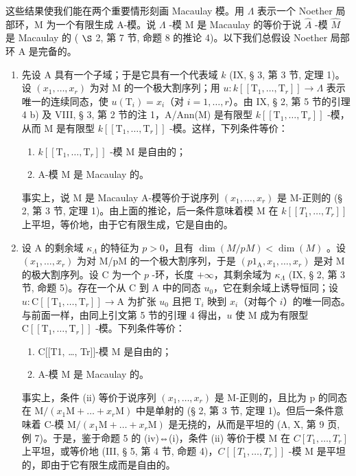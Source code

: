 这些结果使我们能在两个重要情形刻画 Macaulay 模。用 \(\Lambda\) 表示一个 Noether 局部环，M 为一个有限生成 A-模。说 \(\Lambda\) -模 M 是 Macaulay 的等价于说 \(\widehat{A}\) -模 \(\widehat{M}\) 是 Macaulay 的 ( \(\S\) 2, 第 7 节, 命题 8 的推论 4)。以下我们总假设 Noether 局部环 A 是完备的。

\begin{enumerate}
\def\labelenumi{\arabic{enumi})}
\tightlist
\item
  先设 A 具有一个子域；于是它具有一个代表域 \(k\) (IX, § 3, 第 3 节, 定理 1)。设 \((x_{1},\ldots ,x_{r})\) 为对 M 的一个极大割序列；用 \(u:k[[\mathrm{T}_{1},\dots ,\mathrm{T}_{r}]]\longrightarrow \Lambda\) 表示唯一的连续同态，使 \(u(\mathrm{T}_i) = x_i\)（对 \(i = 1,\dots ,r\)）。由 IX, § 2, 第 5 节的引理 4 b) 及 VIII, § 3, 第 2 节的注 1，A/Ann(M) 是有限型 \(k[[\mathrm{T}_{1},\dots ,\mathrm{T}_{r}]]\) -模，从而 M 是有限型 \(k[[\mathrm{T}_{1},\dots ,\mathrm{T}_{r}]]\) -模。这样，下列条件等价：
  \begin{enumerate}
  \def\labelenumii{(\roman{enumii})}
  \item
    \(k[[\mathrm{T}_1,\dots ,\mathrm{T}_r]]\) -模 M 是自由的；
\item
    A-模 M 是 Macaulay 的。
\end{enumerate}

事实上，说 M 是 Macaulay A-模等价于说序列 \((x_{1},\ldots,x_{r})\) 是 M-正则的 (§ 2, 第 3 节, 定理 1)。由上面的推论，后一条件意味着模 M 在 \(k[[T_{1},\ldots,T_{r}]]\) 上平坦，等价地，由于它有限生成，它是自由的。

\item
  设 A 的剩余域 \(\kappa_{\Lambda}\) 的特征为 \(p > 0\)，且有 \(\dim(M/pM) < \dim(M)\) 。设 \((x_1, \ldots, x_r)\) 为对 M/pM 的一个极大割序列，于是 \((p1_{\mathrm{A}}, x_1, \ldots, x_r)\) 是对 M 的极大割序列。设 C 为一个 \(p\) -环，长度 \(+\infty\)，其剩余域为 \(\kappa_{\Lambda}\) (IX, § 2, 第 3 节, 命题 5)。存在一个从 C 到 A 中的同态 \(u_0\)，它在剩余域上诱导恒同；设 \(u: \mathrm{C}[[\mathrm{T}_1, \ldots, \mathrm{T}_r]] \longrightarrow \mathrm{A}\) 为扩张 \(u_0\) 且把 \(\mathrm{T}_i\) 映到 \(x_i\)（对每个 \(i\)）的唯一同态。与前面一样，由同上引文第 5 节的引理 4 得出，\(u\) 使 M 成为有限型 \(\mathrm{C}[[\mathrm{T}_1, \ldots, \mathrm{T}_r]]\) -模。下列条件等价：
  \begin{enumerate}
  \def\labelenumii{(\roman{enumii})}
\item
    C{[}{[}T1, \ldots, Tr{]}{]}-模 M 是自由的；
\item
    A-模 M 是 Macaulay 的。
\end{enumerate}

事实上，条件 (ii) 等价于说序列 \((x_{1},\ldots,x_{r})\) 是 M-正则的，且比为 p 的同态在 \(\mathrm{M}/(x_{1}\mathrm{M}+\ldots+x_{r}\mathrm{M})\) 中是单射的 (§ 2, 第 3 节, 定理 1)。但后一条件意味着 C-模 \(\mathrm{M}/(x_{1}\mathrm{M}+\ldots+x_{r}\mathrm{M})\) 是无挠的，从而是平坦的 (Λ, X, 第 9 页, 例 7)。于是，鉴于命题 5 的 (iv)⇔(i)，条件 (ii) 等价于模 M 在 \(C[T_{1},\ldots,T_{r}]\) 上平坦，或等价地 (III, § 5, 第 4 节, 命题 4)，\(C[[T_{1},\ldots,T_{r}]]\) -模 M 是平坦的，即由于它有限生成而是自由的。

\end{enumerate}

